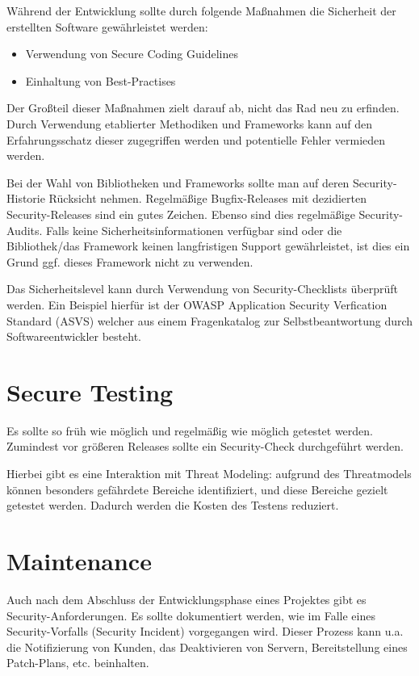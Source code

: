 Während der Entwicklung sollte durch folgende Maßnahmen die Sicherheit der erstellten Software gewährleistet werden: 

\begin{itemize}
	\item Verwendung von Secure Coding Guidelines
	\item Einhaltung von Best-Practises
\end{itemize}

Der Großteil dieser Maßnahmen zielt darauf ab, nicht das Rad neu zu erfinden. Durch Verwendung etablierter Methodiken und Frameworks kann auf den Erfahrungsschatz dieser zugegriffen werden und potentielle Fehler vermieden werden.

Bei der Wahl von Bibliotheken und Frameworks sollte man auf deren Security-Historie Rücksicht nehmen. Regelmäßige Bugfix-Releases mit dezidierten Security-Releases sind ein gutes Zeichen. Ebenso sind dies regelmäßige Security-Audits. Falls keine Sicherheitsinformationen verfügbar sind oder die Bibliothek/das Framework keinen langfristigen Support gewährleistet, ist dies ein Grund ggf. dieses Framework nicht zu verwenden.

Das Sicherheitslevel kann durch Verwendung von Security-Checklists überprüft werden. Ein Beispiel hierfür ist der OWASP Application Security Verfication Standard (ASVS) welcher aus einem Fragenkatalog zur Selbstbeantwortung durch Softwareentwickler besteht.

\section{Secure Testing}

Es sollte so früh wie möglich und regelmäßig wie möglich getestet werden. Zumindest vor größeren Releases sollte ein Security-Check durchgeführt werden.

Hierbei gibt es eine Interaktion mit Threat Modeling: aufgrund des Threatmodels können besonders gefährdete Bereiche identifiziert, und diese Bereiche gezielt getestet werden. Dadurch werden die Kosten des Testens reduziert.

\section{Maintenance}

Auch nach dem Abschluss der Entwicklungsphase eines Projektes gibt es Security-Anforderungen. Es sollte dokumentiert werden, wie im Falle eines Security-Vorfalls (Security Incident) vorgegangen wird. Dieser Prozess kann u.a. die Notifizierung von Kunden, das Deaktivieren von Servern, Bereitstellung eines Patch-Plans, etc. beinhalten.

